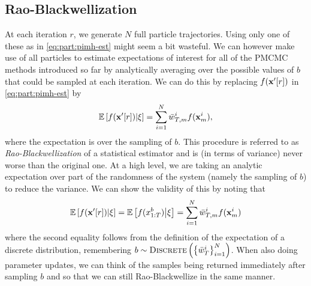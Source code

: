 \subsection{Rao-Blackwellization}
\label{sec:part:pmcmc:all}

At each \mcmc iteration $r$, we generate $N$ full particle trajectories. 
Using only one of these as in \eqref{eq:part:pimh-est} might seem a bit wasteful. 
We can however make use of all particles to estimate expectations of interest for all
of the PMCMC methods introduced so far by analytically averaging over the possible
values of $b$ that could be sampled at each iteration. 
We can do this by replacing $f(\mathbf{x}'[r])$ in \eqref{eq:part:pimh-est}  by
\begin{align}
\label{eq:part:rao-pg}
\mathbb{E}\left[f(\mathbf{x}'[r]) \middle| \mathbf{\xi} \right] 
= \sum_{i=1}^N \bar w_{T,m}^i f(\mathbf{x}_{m}^i),
\end{align}
where the expectation is over the sampling of $b$.
This procedure is referred to as \emph{Rao-Blackwellization} of a statistical estimator and is (in terms of variance) 
never worse than the original one.  At a high level, we are taking an analytic expectation over part of
the randomness of the system (namely the sampling of $b$) to reduce the variance.  We can 
show the validity of this by noting that
\begin{align}
\mathbb{E}\left[f(\mathbf{x}'[r]) \middle| \mathbf{\xi} \right] = 
\mathbb{E}\left[f(x_{1:T}^b) \middle| \mathbf{\xi} \right]
= \sum_{i=1}^N \bar w_{T,m}^i f(\mathbf{x}_{m}^i)
\end{align}
where the second equality follows from the definition of the expectation of a discrete distribution,
remembering $b \sim \operatorname*{\textsc{Discrete}}\left(\left\{\bar w_{T}^i\right\}_{i=1}^N\right)$.
When also doing parameter updates, we can think of the samples being returned immediately after
sampling $b$ and so that we can still Rao-Blackwellize in the same manner.



